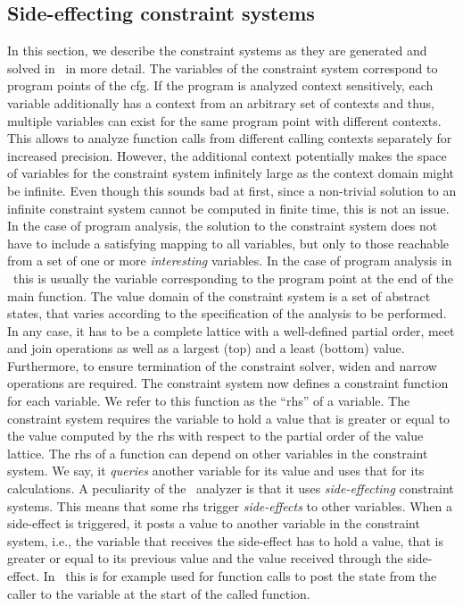   \subsection{Side-effecting constraint systems}
  \label{sec:background:constrSys}
  In this section, we describe the constraint systems as they are generated and solved in \gob\ in more detail. The variables of the constraint system correspond to program points of the \ac{cfg}. If the program is analyzed context sensitively, each variable additionally has a context from an arbitrary set of contexts and thus, multiple variables can exist for the same program point with different contexts. This allows to analyze function calls from different calling contexts separately for increased precision. However, the additional context potentially makes the space of variables for the constraint system infinitely large as the context domain might be infinite. Even though this sounds bad at first, since a non-trivial solution to an infinite constraint system cannot be computed in finite time, this is not an issue. In the case of program analysis, the solution to the constraint system does not have to include a satisfying mapping to all variables, but only to those reachable from a set of one or more \textit{interesting} variables. In the case of program analysis in \gob\ this is usually the variable corresponding to the program point at the end of the main function.
  The value domain of the constraint system is a set of abstract states, that varies according to the specification of the analysis to be performed. In any case, it has to be a complete lattice with a well-defined partial order, meet and join operations as well as a largest (top) and a least (bottom) value. Furthermore, to ensure termination of the constraint solver, widen and narrow operations are required.
  The constraint system now defines a constraint function for each variable. We refer to this function as the ``\ac{rhs}'' of a variable. The constraint system requires the variable to hold a value that is greater or equal to the value computed by the \ac{rhs} with respect to the partial order of the value lattice.
  The \ac{rhs} of a function can depend on other variables in the constraint system. We say, it \textit{queries} another variable for its value and uses that for its calculations.
  A peculiarity of the \gob\ analyzer is that it uses \textit{side-effecting} constraint systems. This means that some \ac{rhs} trigger \textit{side-effects} to other variables. When a side-effect is triggered, it posts a value to another variable in the constraint system, i.e., the variable that receives the side-effect has to hold a value, that is greater or equal to its previous value and the value received through the side-effect. In \gob\ this is for example used for function calls to post the state from the caller to the variable at the start of the called function.
